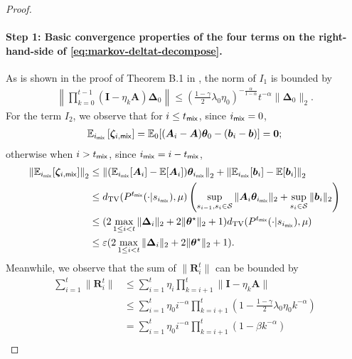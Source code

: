 \begin{proof}
\paragraph{Step 1: Basic convergence properties of the four terms on the right-hand-side of \eqref{eq:markov-deltat-decompose}.} As is shown in the proof of Theorem B.1 in \cite{wu2024statistical}, the norm of $I_1$ is bounded by
\begin{align}\label{eq:markov-deltat-I1-bound}
\left\|\prod_{k=0}^{t-1} (\bm{I}-\eta_k \bm{A}) \bm{\Delta}_0\right\| \leq \left(\frac{1-\gamma}{2}\lambda_0 \eta_0\right)^{-\frac{\alpha}{1-\alpha}} t^{-\alpha} \|\bm{\Delta}_0\|_2.
\end{align}
For the term $I_2$, we observe that for $i \leq t_{\mathsf{mix}}$, since $i_{\mathsf{mix}} = 0$, 
\begin{align*}
\mathbb{E}_{i_{\mathsf{mix}}}\left[\bm{\zeta}_{i,\mathsf{mix}}\right]= \mathbb{E}_0 [(\bm{A}_i-\bm{A})\bm{\theta}_0 - (\bm{b}_i - \bm{b})] = \bm{0};
\end{align*}
otherwise when $i > t_{\mathsf{mix}}$, since $i_{\mathsf{mix}} = i-t_{\mathsf{mix}}$, 
\begin{align}\label{eq:E-zeta-imix}
\left\|\mathbb{E}_{i_{\mathsf{mix}}}[\bm{\zeta}_{i,\mathsf{mix}}]\right\|_2&\leq \left\| (\mathbb{E}_{i_{\mathsf{mix}}}[\bm{A}_i] - \mathbb{E}[\bm{A}_i]) \bm{\theta}_{i_{\mathsf{mix}}}\right\|_2  + \left\|\mathbb{E}_{i_{\mathsf{mix}}}[\bm{b}_i] - \mathbb{E}[\bm{b}_i]\right\|_2\nonumber \\
&\leq d_{\text{TV}}(P^{t_{\mathsf{mix}}}(\cdot|s_{i_{\mathsf{mix}}}),\mu) \left(\sup_{s_{i-1},s_i \in \mathcal{S}} \| \bm{A}_i \bm{\theta}_{i_{\mathsf{mix}}} \|_2 + \sup_{s_i \in \mathcal{S}} \|\bm{b}_i\|_2\right)\nonumber \\
&\leq (2\max_{1 \leq i < t}\|\bm{\Delta}_i\|_2+ 2\|\bm{\theta}^\star\|_2 + 1) d_{\text{TV}}(P^{t_{\mathsf{mix}}}(\cdot|s_{i_{\mathsf{mix}}}),\mu) \nonumber \\ 
&\leq \varepsilon (2\max_{1 \leq i < t}\|\bm{\Delta}_i\|_2+ 2\|\bm{\theta}^\star\|_2 + 1).
\end{align}
Meanwhile, we observe that the sum of $\|\bm{R}_i^t\|$ can be bounded by %
\begin{align*}
\sum_{i=1}^t \|\bm{R}_i^t\| &\leq \sum_{i=1}^t \eta_i \prod_{k=i+1}^t \|\bm{I}-\eta_k \bm{A}\|\\ 
&\leq \sum_{i=1}^t \eta_0 i^{-\alpha} \prod_{k=i+1}^t \left(1-\frac{1-\gamma}{2}\lambda_0 \eta_0 k^{-\alpha}\right)\\ 
&= \sum_{i=1}^t \eta_0 i^{-\alpha} \prod_{k=i+1}^t (1-\beta k^{-\alpha})\\ 

\end{align*}
\end{proof}
